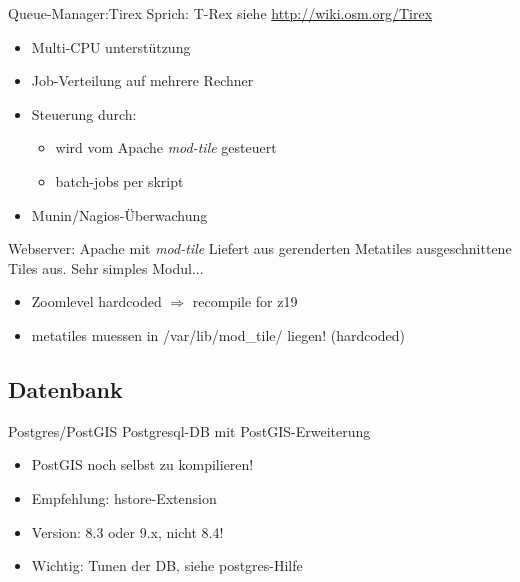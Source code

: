 \documentclass{beamer}
\begin{document}
\begin{frame}{Queue-Manager:Tirex}
  Sprich: T-Rex
  siehe \url{http://wiki.osm.org/Tirex}
  \begin{itemize}
                    \item Multi-CPU unterstützung
                    \item Job-Verteilung auf mehrere Rechner
                    \item Steuerung durch:
                      \begin{itemize}
                      \item wird vom Apache \emph{mod-tile} gesteuert
                      \item batch-jobs per skript
                    \end{itemize}
                  \item Munin/Nagios-Überwachung
                \end{itemize}


\end{frame}

\begin{frame}{Webserver: Apache mit \emph{mod-tile}}
  Liefert aus gerenderten Metatiles ausgeschnittene Tiles aus.
  \pause
  Sehr simples Modul...
  \begin{itemize}
                          \item Zoomlevel hardcoded $\Rightarrow$ recompile for z19
                          \item metatiles muessen in  /var/lib/mod\_tile/ liegen! (hardcoded)
                        \end{itemize}

\end{frame}

\subsection{Datenbank}


\begin{frame}{Postgres/PostGIS}
Postgresql-DB mit PostGIS-Erweiterung
\begin{itemize}
  \item PostGIS noch selbst zu kompilieren!
  \item Empfehlung: hstore-Extension
  \item Version: 8.3 oder 9.x, nicht 8.4!
	\item Wichtig: Tunen der DB, siehe postgres-Hilfe
\end{itemize}

\end{frame}
\end{document}
